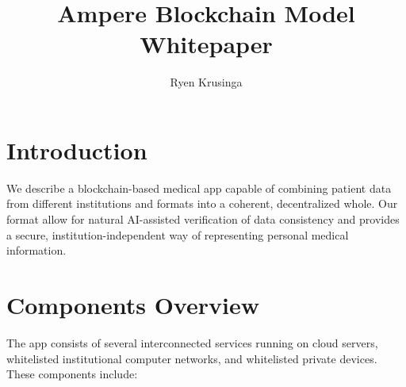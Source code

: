 \documentclass[12pt]{article}
\title{Ampere Blockchain Model Whitepaper}
\author{Ryen Krusinga}
\begin{document}
\maketitle

\tableofcontents


\section{Introduction}
We describe a blockchain-based medical app capable of combining patient data from different institutions and formats into a coherent, decentralized whole. Our format allow for natural AI-assisted verification of data consistency and provides a secure, institution-independent way of representing personal medical information.

\section{Components Overview}
The app consists of several interconnected services running on cloud servers, whitelisted institutional computer networks, and whitelisted private devices. These components include:
\end{document}
